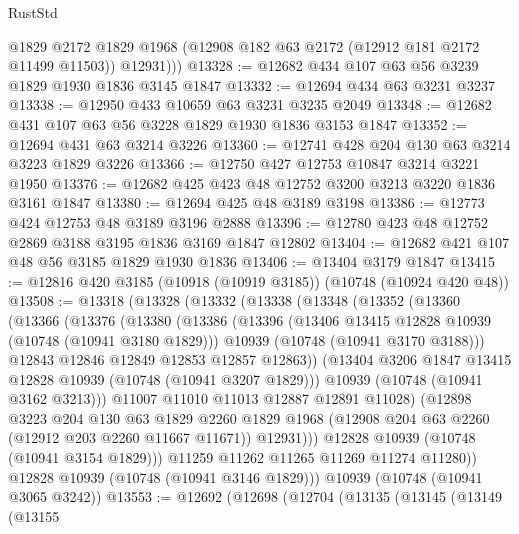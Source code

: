 \begin{lexlean}{RustStd}
\begin{coremodule}
{\begin{coremodule}
{{{{{          @1829
          @2172
          @1829
          @1968
          (@12908 @182 @63 @2172 (@12912 @181 @2172 @11499 @11503))
          @12931)))
@13328 := @12682 @434 @107 @63 @56 @3239 @1829 @1930 @1836 @3145 @1847
@13332 := @12694 @434 @63 @3231 @3237
@13338 := @12950 @433 @10659 @63 @3231 @3235 @2049
@13348 := @12682 @431 @107 @63 @56 @3228 @1829 @1930 @1836 @3153 @1847
@13352 := @12694 @431 @63 @3214 @3226
@13360 := @12741 @428 @204 @130 @63 @3214 @3223 @1829 @3226
@13366 := @12750 @427 @12753 @10847 @3214 @3221 @1950
@13376 := @12682 @425 @423 @48 @12752 @3200 @3213 @3220 @1836 @3161 @1847
@13380 := @12694 @425 @48 @3189 @3198
@13386 := @12773 @424 @12753 @48 @3189 @3196 @2888
@13396 := @12780 @423 @48 @12752 @2869 @3188 @3195 @1836 @3169 @1847 @12802
@13404 := @12682 @421 @107 @48 @56 @3185 @1829 @1930 @1836
@13406 := @13404 @3179 @1847
@13415 := @12816 @420 @3185 (@10918 (@10919 @3185)) (@10748 (@10924 @420 @48))
@13508 := @13318
    (@13328
      (@13332
        (@13338
          (@13348
            (@13352
              (@13360
                (@13366
                  (@13376
                    (@13380
                      (@13386
                        (@13396
                          (@13406 @13415 @12828 @10939 (@10748 (@10941 @3180 @1829)))
                          @10939
                          (@10748 (@10941 @3170 @3188)))
                        @12843
                        @12846
                        @12849
                        @12853
                        @12857
                        @12863))
                    (@13404 @3206 @1847 @13415 @12828 @10939 (@10748 (@10941 @3207 @1829)))
                    @10939
                    (@10748 (@10941 @3162 @3213)))
                  @11007
                  @11010
                  @11013
                  @12887
                  @12891
                  @11028)
                (@12898
                  @3223
                  @204
                  @130
                  @63
                  @1829
                  @2260
                  @1829
                  @1968
                  (@12908 @204 @63 @2260 (@12912 @203 @2260 @11667 @11671))
                  @12931)))
            @12828
            @10939
            (@10748 (@10941 @3154 @1829)))
          @11259
          @11262
          @11265
          @11269
          @11274
          @11280))
      @12828
      @10939
      (@10748 (@10941 @3146 @1829)))
    @10939
    (@10748 (@10941 @3065 @3242))
@13553 := @12692
    (@12698
      (@12704
        (@13135
          (@13145
            (@13149
              (@13155
}}}}}
\end{coremodule}}
\end{coremodule}
\end{lexlean}
